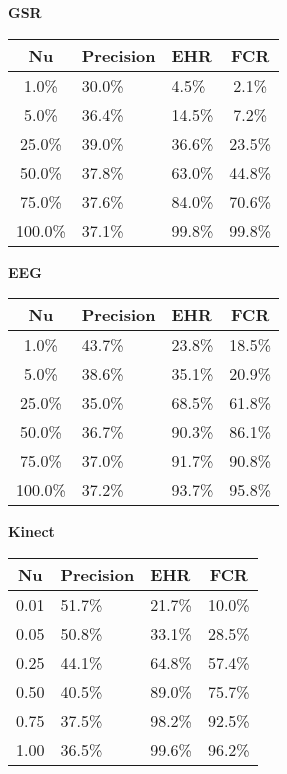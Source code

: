 \begin{table}[H]
  \centering
  \textbf{GSR}\vspace{2pt}
  \begin{tabularx}{\columnwidth}{cXXc}
    \toprule
    \textbf{Nu} & \textbf{Precision} & \textbf{EHR} & \textbf{FCR} \\
    \midrule
    1.0\% & 30.0\% & 4.5\% & 2.1\% \\ \hline
    5.0\% & 36.4\% & 14.5\% & 7.2\% \\ \hline
    25.0\% & 39.0\% & 36.6\% & 23.5\% \\ \hline
    50.0\% & 37.8\% & 63.0\% & 44.8\% \\ \hline
    75.0\% & 37.6\% & 84.0\% & 70.6\% \\ \hline
    100.0\% & 37.1\% & 99.8\% & 99.8\% \\ \hline
    \bottomrule
  \end{tabularx}

  \vspace{4pt}

  \textbf{EEG}\vspace{2pt}
  \begin{tabularx}{\columnwidth}{cXXc}
    \toprule
    \textbf{Nu} & \textbf{Precision} & \textbf{EHR} & \textbf{FCR} \\
    \midrule
    1.0\% & 43.7\% & 23.8\% & 18.5\% \\ \hline
    5.0\% & 38.6\% & 35.1\% & 20.9\% \\ \hline
    25.0\% & 35.0\% & 68.5\% & 61.8\% \\ \hline
    50.0\% & 36.7\% & 90.3\% & 86.1\% \\ \hline
    75.0\% & 37.0\% & 91.7\% & 90.8\% \\ \hline
    100.0\% & 37.2\% & 93.7\% & 95.8\% \\ \hline
    \bottomrule
  \end{tabularx}

  \vspace{4pt}

  \textbf{Kinect}\vspace{2pt}
  \begin{tabularx}{\columnwidth}{cXXc}
    \toprule
    \textbf{Nu} & \textbf{Precision} & \textbf{EHR} & \textbf{FCR} \\
    \midrule
    0.01 & 51.7\% & 21.7\% & 10.0\% \\ \hline
    0.05 & 50.8\% & 33.1\% & 28.5\% \\ \hline
    0.25 & 44.1\% & 64.8\% & 57.4\% \\ \hline
    0.50 & 40.5\% & 89.0\% & 75.7\% \\ \hline
    0.75 & 37.5\% & 98.2\% & 92.5\% \\ \hline
    1.00 & 36.5\% & 99.6\% & 96.2\% \\ \hline
    \bottomrule
  \end{tabularx}


\end{table}
